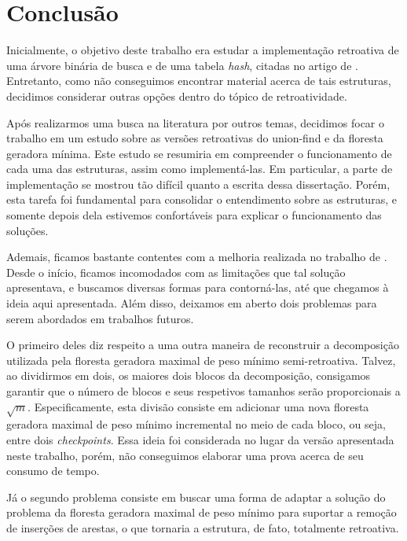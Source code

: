 
\chapter{Conclusão}
\label{cap:conclusao}

Inicialmente, o objetivo deste trabalho era estudar a implementação retroativa de uma árvore binária de busca e de uma tabela \emph{hash}, citadas no artigo de \citet{agarwalimplementation}. Entretanto, como não conseguimos encontrar material acerca de tais estruturas, decidimos considerar outras opções dentro do tópico de retroatividade.

Após realizarmos uma busca na literatura por outros temas, decidimos focar o trabalho em um estudo sobre as versões retroativas do union-find e da floresta geradora mínima. Este estudo se resumiria em compreender o funcionamento de cada uma das estruturas, assim como implementá-las. Em particular, a parte de implementação se mostrou tão difícil quanto a escrita dessa dissertação. Porém, esta tarefa foi fundamental para consolidar o entendimento sobre as estruturas, e somente depois dela estivemos confortáveis para explicar o funcionamento das soluções.

Ademais, ficamos bastante contentes com a melhoria realizada no trabalho de \citet{10.1093/comjnl/bxaa135}. Desde o início, ficamos incomodados com as limitações que tal solução apresentava, e buscamos diversas formas para contorná-las, até que chegamos à ideia aqui apresentada. Além disso, deixamos em aberto dois problemas para serem abordados em trabalhos futuros.

O primeiro deles diz respeito a uma outra maneira de reconstruir a decomposição utilizada pela floresta geradora maximal de peso mínimo semi-retroativa. Talvez, ao dividirmos em dois, os maiores dois blocos da decomposição, consigamos garantir que o número de blocos e seus respetivos tamanhos serão proporcionais a $\sqrt{m}$. Especificamente, esta divisão consiste em adicionar uma nova floresta geradora maximal de peso mínimo incremental no meio de cada bloco, ou seja, entre dois \emph{checkpoints}. Essa ideia foi considerada no lugar da versão apresentada neste trabalho, porém, não conseguimos elaborar uma prova acerca de seu consumo de tempo.

Já o segundo problema consiste em buscar uma forma de adaptar a solução do problema da floresta geradora maximal de peso mínimo para suportar a remoção de inserções de arestas, o que tornaria a estrutura, de fato, totalmente retroativa.


